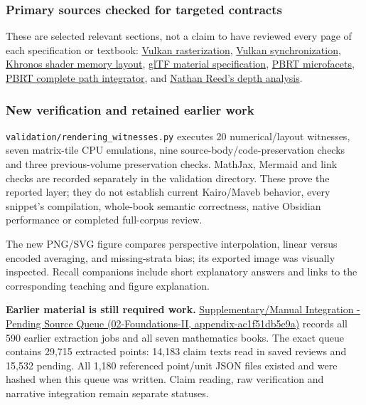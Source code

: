 \subsubsection{Primary sources checked for targeted contracts}\label{appendix-3b67654799a2-primary-sources-checked-for-targeted-contracts}

These are selected relevant sections, not a claim to have reviewed every page of each specification or textbook: \href{https://docs.vulkan.org/spec/latest/chapters/primsrast.html}{Vulkan rasterization}, \href{https://docs.vulkan.org/spec/latest/chapters/synchronization.html}{Vulkan synchronization}, \href{https://docs.vulkan.org/guide/latest/shader_memory_layout.html}{Khronos shader memory layout}, \href{https://raw.githubusercontent.com/KhronosGroup/glTF/main/specification/2.0/Specification.adoc}{glTF material specification}, \href{https://pbr-book.org/4ed/Reflection_Models/Roughness_Using_Microfacet_Theory}{PBRT microfacets}, \href{https://pbr-book.org/4ed/Light_Transport_I_Surface_Reflection/A_Better_Path_Tracer}{PBRT complete path integrator}, and \href{https://developer.nvidia.com/blog/visualizing-depth-precision/}{Nathan Reed's depth analysis}.

\subsubsection{New verification and retained earlier work}\label{appendix-3b67654799a2-new-verification-and-retained-earlier-work}

\texttt{validation/rendering\_witnesses.py} executes 20 numerical/layout witnesses, seven matrix-tile CPU emulations, nine source-body/code-preservation checks and three previous-volume preservation checks. MathJax, Mermaid and link checks are recorded separately in the validation directory. These prove the reported layer; they do not establish current Kairo/Maveb behavior, every snippet's compilation, whole-book semantic correctness, native Obsidian performance or completed full-corpus review.

The new PNG/SVG figure compares perspective interpolation, linear versus encoded averaging, and missing-strata bias; its exported image was visually inspected. Recall companions include short explanatory answers and links to the corresponding teaching and figure explanation.

\textbf{Earlier material is still required work.} \href{../02-Foundations-II/main.pdf\#nameddest=appendix-ac1f51db5e9a}{Supplementary/Manual Integration - Pending Source Queue (02-Foundations-II, appendix-ac1f51db5e9a)} records all 590 earlier extraction jobs and all seven mathematics books. The exact queue contains 29,715 extracted points: 14,183 claim texts read in saved reviews and 15,532 pending. All 1,180 referenced point/unit JSON files existed and were hashed when this queue was written. Claim reading, raw verification and narrative integration remain separate statuses.

